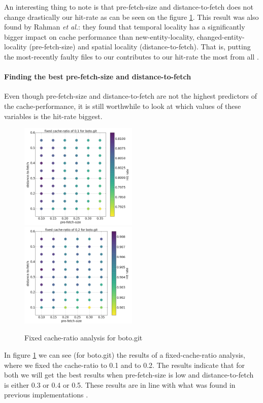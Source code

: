 \documentclass[12pt,twoside,notitlepage]{report}
\newcommand{\etal}{\textit{et al.}}
\begin{document}
An interesting thing to note is that pre-fetch-size and distance-to-fetch does not change drastically our hit-rate as can be seen on the figure \ref{fig:fixed_cache}. This result was also found by Rahman \etal{}: they found that temporal locality has a significantly bigger impact on cache performance than new-entity-locality, changed-entity-locality (pre-fetch-size) and spatial locality (distance-to-fetch). That is, putting the most-recently faulty files to our contributes to our hit-rate the most from all \cite{Bugcache}.
\paragraph{Finding the best pre-fetch-size and distance-to-fetch}Even though pre-fetch-size and distance-to-fetch are not the highest predictors of the cache-performance, it is still worthwhile to look at which values of these variables is the hit-rate biggest.
\begin{figure}[h]
\includegraphics[width=0.5\textwidth]{fixed_cache-1.png}
\includegraphics[width=0.5\textwidth]{fixed_cache-2.png}
\caption{Fixed cache-ratio analysis for boto.git}
\label{fig:fixed_cache}
\end{figure}
In figure \ref{fig:fixed_cache} we can see (for boto.git) the results of a fixed-cache-ratio analysis, where we fixed the cache-ratio to 0.1 and to 0.2. The results indicate that for both we will get the best results when pre-fetch-size is low and distance-to-fetch is either 0.3 or 0.4 or 0.5. These results are in line with what was found in previous implementations \cite{FixCache}.
\end{document}
